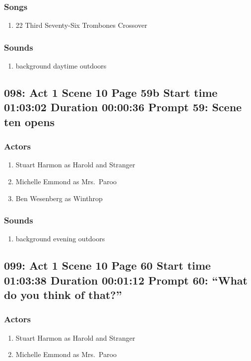 \subsubsection{Songs}
\begin{enumerate}
\item 22 Third Seventy-Six Trombones Crossover
\end{enumerate}\subsubsection{Sounds}
\begin{enumerate}
\item background daytime outdoors
\end{enumerate}
\subsection{098: Act 1 Scene 10 Page 59b Start time 01:03:02 Duration 00:00:36 Prompt 59: Scene ten opens}

\subsubsection{Actors}
\begin{enumerate}
\item Stuart Harmon as Harold and Stranger
\item Michelle Emmond as Mrs.~Paroo
\item Ben Wesenberg as Winthrop
\end{enumerate}

\subsubsection{Sounds}
\begin{enumerate}
\item background evening outdoors
\end{enumerate}
\subsection{099: Act 1 Scene 10 Page 60 Start time 01:03:38 Duration 00:01:12 Prompt 60: ``What do you think of that?''}

\subsubsection{Actors}
\begin{enumerate}
\item Stuart Harmon as Harold and Stranger
\item Michelle Emmond as Mrs.~Paroo
\end{enumerate}

